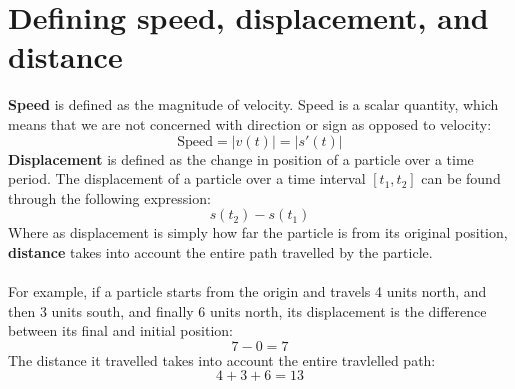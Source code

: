 \documentclass[11pt]{scrartcl}
\begin{document}
\section{Defining speed, displacement, and distance}
\textbf{Speed} is defined as the magnitude of velocity. Speed is a scalar quantity, which means that we are not concerned with direction or sign as opposed to velocity: 
$$\text{Speed}=\lvert v(t) \rvert = \lvert  s'(t) \rvert $$
\textbf{Displacement} is defined as the change in position of a particle over a time period. The displacement of a particle over a time interval $[t_1,t_2]$ can be found through the following expression:
$$s(t_2)-s(t_1)$$
Where as displacement is simply how far the particle is from its original position, \textbf{distance} takes into account the entire path travelled by the particle. \\
\\
\noindent 
For example, if a particle starts from the origin and travels 4 units north, and then 3 units south, and finally 6 units north, its displacement is the difference between its final and initial position: 
$$7-0=7$$
The distance it travelled takes into account the entire travlelled path: 
$$4+3+6=13$$
\end{document}
